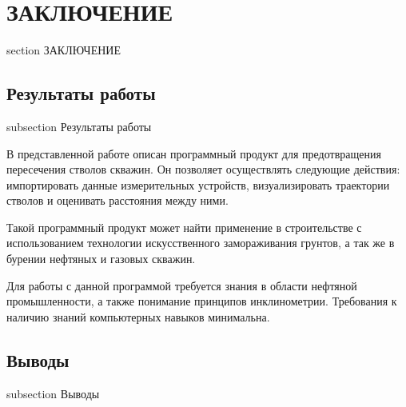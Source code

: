 \newpage
\section*{ЗАКЛЮЧЕНИЕ}
 {section} {ЗАКЛЮЧЕНИЕ}

\subsection*{Результаты работы}
 {subsection} {Результаты работы}

В представленной работе описан программный продукт для предотвращения пересечения стволов скважин.
Он позволяет осуществлять следующие действия:
импортировать данные измерительных устройств, визуализировать траектории стволов и оценивать расстояния между ними.

Такой программный продукт может найти применение в строительстве с использованием технологии искусственного замораживания
грунтов, а так же в бурении нефтяных и газовых скважин.

Для работы с данной программой требуется знания в области нефтяной промышленности, а также понимание принципов инклинометрии.
Требования к наличию знаний компьютерных навыков минимальна.

\subsection*{Выводы}
 {subsection} {Выводы}
